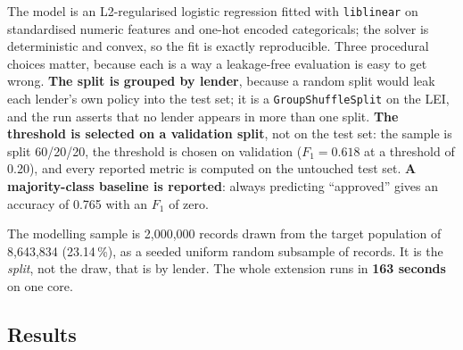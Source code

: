\documentclass[sigconf,balance=false]{acmart}
\begin{document}
The model is an L2-regularised logistic regression fitted with
\texttt{liblinear} on standardised numeric features and one-hot encoded
categoricals; the solver is deterministic and convex, so the fit is exactly
reproducible. Three procedural choices matter, because each is a way a
leakage-free evaluation is easy to get wrong. \textbf{The split is grouped
by lender}, because a random split would leak each lender's own policy into
the test set; it is a \texttt{GroupShuffleSplit} on the LEI, and the run
asserts that no lender appears in more than one split. \textbf{The threshold
is selected on a validation split}, not on the test set: the sample is split
60/20/20, the threshold is chosen on validation ($F_1 = 0.618$ at a
threshold of 0.20), and every reported metric is computed on the untouched
test set. \textbf{A majority-class baseline is reported}: always predicting
``approved'' gives an accuracy of 0.765 with an $F_1$ of zero.

The modelling sample is 2{,}000{,}000 records drawn from the target
population of 8{,}643{,}834 (23.14\,\%), as a seeded uniform random
subsample of records. It is the \emph{split}, not the draw, that is by
lender. The whole extension runs in \textbf{163 seconds} on one core.

\subsection{Results}
\end{document}
